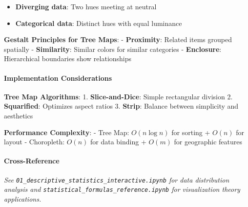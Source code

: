 \documentclass[11pt]{article}
\providecommand{\tightlist}{%
      \setlength{\itemsep}{0pt}\setlength{\parskip}{0pt}}
\begin{document}
\begin{itemize}
\tightlist
\item
  \textbf{Diverging data}: Two hues meeting at neutral
\item
  \textbf{Categorical data}: Distinct hues with equal luminance
\end{itemize}

\textbf{Gestalt Principles for Tree Maps}: - \textbf{Proximity}: Related
items grouped spatially - \textbf{Similarity}: Similar colors for
similar categories - \textbf{Enclosure}: Hierarchical boundaries show
relationships

\paragraph{Implementation
Considerations}\label{implementation-considerations}

\textbf{Tree Map Algorithms}: 1. \textbf{Slice-and-Dice}: Simple
rectangular division 2. \textbf{Squarified}: Optimizes aspect ratios 3.
\textbf{Strip}: Balance between simplicity and aesthetics

\textbf{Performance Complexity}: - Tree Map: \(O(n \log n)\) for sorting
+ \(O(n)\) for layout - Choropleth: \(O(n)\) for data binding + \(O(m)\)
for geographic features

\paragraph{Cross-Reference}\label{cross-reference}

\emph{See \texttt{01\_descriptive\_statistics\_interactive.ipynb} for
data distribution analysis and
\texttt{statistical\_formulas\_reference.ipynb} for visualization theory
applications.}
\end{document}
